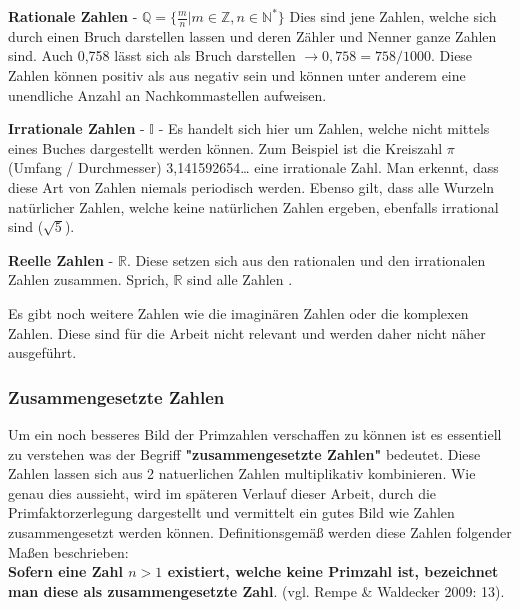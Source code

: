 \documentclass[german,12pt,a4paper]{article}
\begin{document}
\textbf{Rationale Zahlen} - %
$\mathbb{Q} = \{\frac{m}{n} | m \in \mathbb{Z}, n \in \mathbb{N}^*\}$
Dies sind jene Zahlen, welche sich durch einen Bruch darstellen lassen und deren Zähler und Nenner ganze Zahlen sind. %
Auch 0,758 lässt sich als Bruch darstellen $\rightarrow{0,758 = 758/1000}$. Diese Zahlen können positiv als aus negativ sein und können unter anderem eine unendliche Anzahl an Nachkommastellen aufweisen.

\textbf{Irrationale Zahlen} - $\mathbb{I}$ - Es handelt sich hier um Zahlen, welche nicht mittels eines Buches dargestellt werden können. Zum Beispiel ist die Kreiszahl $\pi$ (Umfang / Durchmesser) 3,141592654… eine irrationale Zahl. Man erkennt, dass diese Art von Zahlen niemals periodisch werden. Ebenso gilt, dass alle Wurzeln natürlicher Zahlen, welche keine natürlichen Zahlen ergeben, ebenfalls irrational sind ($\sqrt{5}$). %

\textbf{Reelle Zahlen} - $\mathbb{R}$. Diese setzen sich aus den rationalen und den irrationalen Zahlen zusammen. Sprich, $\mathbb{R}$ sind alle Zahlen \autocite{vgl. Engel 2017: 7-9}. %

Es gibt noch weitere Zahlen wie die imaginären Zahlen oder die komplexen Zahlen. Diese sind für die Arbeit nicht relevant und werden daher nicht näher ausgeführt.

\subsubsection{Zusammengesetzte Zahlen}
Um ein noch besseres Bild der Primzahlen verschaffen zu können ist es essentiell zu verstehen was der Begriff \textbf{"{zusammengesetzte Zahlen}"} bedeutet. Diese Zahlen lassen sich aus 2 natuerlichen Zahlen multiplikativ kombinieren. Wie genau dies aussieht, wird im späteren Verlauf dieser Arbeit, durch die Primfaktorzerlegung dargestellt und vermittelt ein gutes Bild wie Zahlen zusammengesetzt werden können. Definitionsgemäß werden diese Zahlen folgender Maßen beschrieben:\\
\hspace*{10mm}\textbf{Sofern eine Zahl $n > 1$ existiert, welche keine Primzahl ist, bezeichnet man diese als zusammengesetzte Zahl}. (vgl. Rempe \& Waldecker 2009: 13).\\
\end{document}
